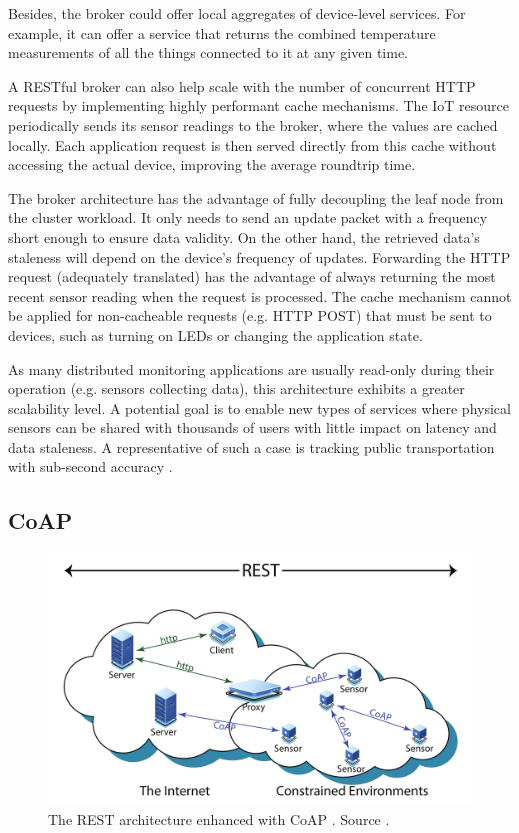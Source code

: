 Besides, the broker could offer local aggregates of device-level services. For example, it can offer a service that returns the combined temperature measurements of all the things connected to it at any given time.

A RESTful broker can also help scale with the number of concurrent HTTP requests by implementing highly performant cache mechanisms. The IoT resource periodically sends its sensor readings to the broker, where the values are cached locally. Each application request is then served directly from this cache without accessing the actual device, improving the average roundtrip time.

The broker architecture has the advantage of fully decoupling the leaf node from the cluster workload. It only needs to send an update packet with a frequency short enough to ensure data validity. On the other hand, the retrieved data's staleness will depend on the device's frequency of updates. Forwarding the HTTP request (adequately translated) has the advantage of always returning the most recent sensor reading when the request is processed. The cache mechanism cannot be applied for non-cacheable requests (e.g. HTTP POST) that must be sent to devices, such as turning on LEDs or changing the application state.

As many distributed monitoring applications are usually read-only during their operation (e.g. sensors collecting data), this architecture exhibits a greater scalability level. A potential goal is to enable new types of services where physical sensors can be shared with thousands of users with little impact on latency and data staleness. A representative of such a case is tracking public transportation with sub-second accuracy \cite{elbamby2019wireless}.

\subsection{CoAP}
\label{sec:coap}

\begin{figure}[ht]
\centering
\includegraphics[width=\columnwidth]{figures/coap}
\caption{The REST architecture enhanced with CoAP \label{fig:coap}. Source \cite{bormann2012coap}.}
\end{figure}

